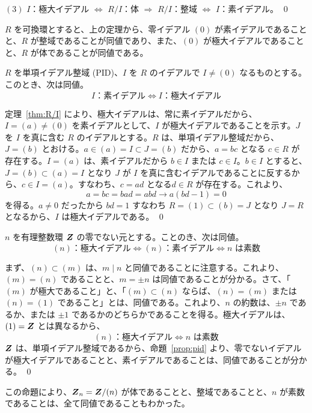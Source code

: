 $(3)$ $I$：極大イデアル $\Leftrightarrow$ $R/I$：体 $\Rightarrow$ $R/I$：整域 $\Leftrightarrow$ $I$：素イデアル。
\qed

\medskip
\note
$R$ を可換環とすると、上の定理から、零イデアル $(0)$ が素イデアルであることと、$R$ が整域であることが同値であり、また、$(0)$ が極大イデアルであることと、$R$ が体であることが同値である。

\begin{prop} \label{prop:pid}
$R$ を単項イデアル整域 {\rm (PID)}、$I$ を $R$ のイデアルで $I\neq (0)$ なるものとする。このとき、次は同値。
$$I\mbox{：素イデアル} \Leftrightarrow I\mbox{：極大イデアル}$$
\end{prop}
\proof
定理~\ref{thm:R/I} により、極大イデアルは、常に素イデアルだから、$I = (a) \neq (0)$ を素イデアルとして、$I$ が極大イデアルであることを示す。$J$ を $I$ を真に含む $R$ のイデアルとする。$R$ は、単項イデアル整域だから、$J = (b)$ とおける。$a\in (a) = I \subset J = (b)$ だから、$a = bc$ となる $c\in R$ が存在する。$I = (a)$ は、素イデアルだから $b\in I$ または $c\in I$。$b\in I$ とすると、$J = (b) \subset (a) = I$ となり $J$ が $I$  を真に含むイデアルであることに反するから、$c\in I = (a)$。すなわち、$c = ad$ となる$d\in R$ が存在する。これより、$$a = bc = bad = abd\rightarrow a(bd - 1) = 0$$
を得る。$a\neq 0$ だったから $bd = 1$ すなわち $R = (1) \subset (b) = J$ となり $J = R$ となるから、$I$ は極大イデアルである。
\qed

\begin{prop} \label{prop:integer}
$n$ を有理整数環 $\mbox{\boldmath $Z$}$ の零でない元とする。ことのき、次は同値。
$$(n)\mbox{：極大イデアル} \Leftrightarrow (n)\mbox{：素イデアル}\Leftrightarrow n\mbox{ は素数}$$
\end{prop}
\proof
まず、$(n) \subset (m)$ は、$m\mid n$ と同値であることに注意する。これより、$(m) = (n)$ であることと、$m = \pm n$ は同値であることが分かる。さて、「$(m)$ が極大であること」と、「$(m)\subset (n)$ ならば、$(n) = (m)$ または $(n) = (1)$ であること」とは、同値である。これより、$n$ の約数は、$\pm n$ であるか、または $\pm 1$ であるかのどちらかであることを得る。極大イデアルは、$(1) = \mbox{\boldmath $Z$}$ とは異なるから、
$$(n)\mbox{：極大イデアル} \Leftrightarrow  n\mbox{ は素数}$$
$\mbox{\boldmath $Z$}$ は、単項イデアル整域であるから、命題~\ref{prop:pid} より、零でないイデアルが極大イデアルであることと、素イデアルであることは、同値であることが分かる。
\qed

\medskip
\note
この命題により、$\mbox{\boldmath $Z$}_n = \mbox{\boldmath $Z$}/(n)$ が体であることと、整域であることと、$n$ が素数であることは、全て同値であることもわかった。

